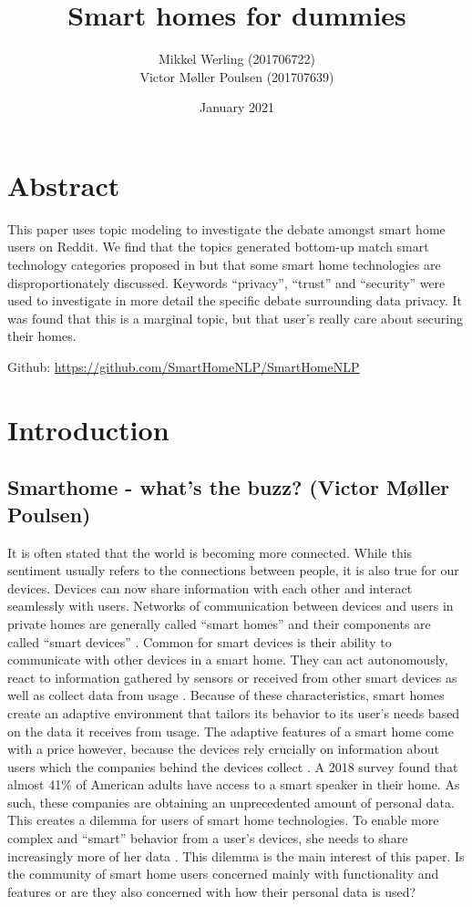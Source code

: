 \documentclass{article}
\title{Smart homes for dummies}
\author{Mikkel Werling (201706722) \\ Victor Møller Poulsen (201707639)}
\date{January 2021}
\begin{document}
    \maketitle
    \section{Abstract}
    This paper uses topic modeling to investigate the debate amongst smart home users on Reddit. We find that the topics generated bottom-up match smart technology categories proposed in  but that some smart home technologies are disproportionately discussed. Keywords “privacy”, “trust” and “security” were used to investigate in more detail the specific debate surrounding data privacy. It was found that this is a marginal topic, but that user’s really care about securing their homes.  
    \begin{center}
    Github: \url{https://github.com/SmartHomeNLP/SmartHomeNLP}
\end{center}

    \section{Introduction}
    \subsection{Smarthome - what's the buzz? (Victor Møller Poulsen)}
    It is often stated that the world is becoming more connected. While this sentiment usually refers to the connections between people, it is also true for our devices. Devices can now share information with each other and interact seamlessly with users. Networks of communication between devices and users in private homes are generally called “smart homes” and their components are called “smart devices” \cite{novak2019relationship}. Common for 
smart devices is their ability to communicate with other devices in a smart home. They can act autonomously, react to information gathered by sensors or received from other smart devices as well as collect data from usage \cite{hubert2020take}. Because of these characteristics, smart homes create an adaptive environment that tailors its behavior to its user’s needs based on the data it receives from usage. The adaptive features of a smart home come with a price however, because the devices rely crucially on information about users which the companies behind the devices collect \cite{novak2019relationship}. A 2018 survey \cite{perez_smart_2018} found that almost 41\% of American adults have access to a smart speaker in their home. As such, these companies are obtaining an unprecedented amount of personal data. This creates a dilemma for users of smart home technologies. To enable more complex and “smart” behavior from a user’s devices, she needs to share increasingly more of her data \cite{hubert2020take}. This dilemma is the main interest of this paper. Is the community of smart home users concerned mainly with functionality and features or are they also concerned with how their personal data is used?
\end{document}
